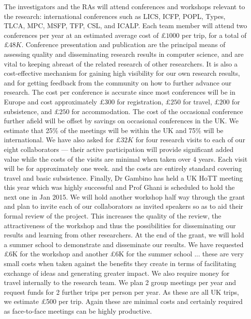 \documentclass[a4paper,11pt]{article}
\begin{document}
\vspace{0.02in}

 The investigators and the RAs will
attend conferences and workshops relevant to the research:
international conferences such as LICS, ICFP, POPL, Types, TLCA, MPC,
MSFP, TFP, CSL, and ICALP. Each team member will
attend two conferences per year at an estimated average cost of
$\pounds 1000$ per trip, for a total of $\pounds 48K$. Conference
presentation and publication are the principal
means of assessing quality and disseminating
research results in computer science, and are vital to
keeping abreast of the related research of other researchers. It is
also a cost-effective mechanism for gaining high visibility for our
own research results, and for getting feedback from the community on
how to further advance our research. The cost per conference
is accurate since most conferences will be in Europe and cost
approximately $\pounds 300$ for registration, $\pounds 250$ for
travel, $\pounds 200$ for subsistence, and $\pounds 250$ for
accommodation. The cost of the occasional conference further afield
will be offset by savings on occasional conferences in the UK. We
estimate that 25\% of the meetings will be within the UK and 75\% will
be international.  We have also asked for $\pounds 32K$ for four research
visits to each of our eight collaborators --- their active
participation
will provide significant added value while the costs of the 
visits are minimal when taken
over  4 years. Each visit will be for approximately one week.
and the costs are entirely standard covering travel and basic
subsistence. Finally, Dr Gambino has held a UK HoTT meeting this year
which was highly successful and Prof Ghani is scheduled to hold the
next one in Jan 2015. We will hold another workshop half way through
the grant and plan to invite each
of our collaborators as invited speakers so as to aid their formal review of the
project. This increases the quality of the review, the attractiveness of the
workshop and thus the possibilities for disseminating our results and
learning from other researchers. At the end of the grant, we will hold
a summer school to demonstrate and disseminate our results.  We have
requested \pounds 6K for the workshop and another \pounds 6K for the
summer school ... these are very small costs when taken against the 
benefits they create in terms of facilitating exchange of ideas
and generating greater impact. We also require money for travel
internally to the research team. We plan 2 group meetings per year and
request funds for 2 further trips per person per year. As these are
all UK trips, we estimate \pounds 500 per trip. Again these are
minimal costs and certainly required as face-to-face meetings can be
highly productive.


%
\end{document}
